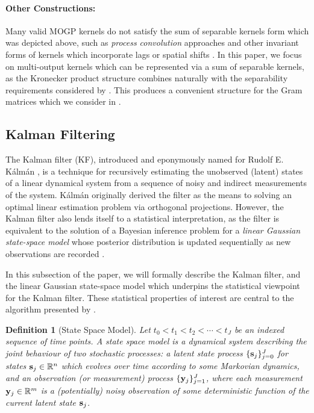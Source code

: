\documentclass[10pt]{article}
\newtheorem{definition}{Definition}
\begin{document}
\paragraph{Other Constructions:} Many valid MOGP kernels do not satisfy the sum of separable kernels form which was depicted above, such as \emph{process convolution} approaches \citep{Boyle-Dependent-GP-2004} and other invariant forms of kernels which incorporate lags or spatial shifts \citep{Alvarez-Vector-Kernels-2012}. In this paper, we focus on multi-output kernels which can be represented via a sum of separable kernels, as the Kronecker product structure combines naturally with the separability requirements considered by \citet{Todescato-Efficient-2020}. This produces a convenient structure for the Gram matrices which we consider in .

\subsection{Kalman Filtering}
\label{subsec:kalman}

The Kalman filter (KF), introduced and eponymously named for Rudolf E. K{\'a}lm{\'a}n \citeyearpar{Kalman-Filter-1960}, is a technique for recursively estimating the unobserved (latent) states of a linear dynamical system from a sequence of noisy and indirect measurements of the system. K{\'a}lm{\'a}n originally derived the filter as the means to solving an optimal linear estimation problem via orthogonal projections. However, the Kalman filter also lends itself to a statistical interpretation, as the filter is equivalent to the solution of a Bayesian inference problem for a \emph{linear Gaussian state-space model} whose posterior distribution is updated sequentially as new observations are recorded \citep{Bayesian-Filter-Book-2023}.

In this subsection of the paper, we will formally describe the Kalman filter, and the linear Gaussian state-space model which underpins the statistical viewpoint for the Kalman filter. These statistical properties of interest are central to the algorithm presented by \citet{Todescato-Efficient-2020}.

\begin{definition}[State Space Model]
\label{def:SSM}  
    Let $t_{0} < t_{1} < t_{2} < \cdots < t_{J}$ be an indexed sequence of time points. A state space model is a dynamical system describing the joint behaviour of two stochastic processes: a {latent state} process $\{\mathbf{s}_{j}\}_{j=0}^{J}$ for states $\mathbf{s}_{j} \in \mathbb{R}^{n}$ which evolves over time according to some Markovian dynamics, and an {observation} (or {measurement}) process $\{\mathbf{y}_{j}\}_{j=1}^{J}$, where each measurement $\mathbf{y}_{j} \in \mathbb{R}^{m}$ is a (potentially) noisy observation of some deterministic function of the current latent state $\mathbf{s}_{j}$.
\end{definition}
\end{document}
